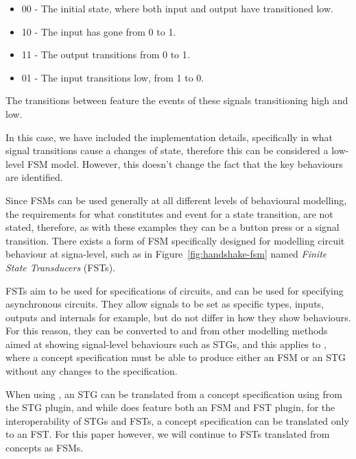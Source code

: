 \begin{itemize}

\item 00 - The initial state, where both input and output have transitioned low.

\item 10 - The input has gone from 0 to 1.

\item 11 - The output transitions from 0 to 1.

\item 01 - The input transitions low, from 1 to 0.

\end{itemize}

\noindent The transitions between feature the events of these signals transitioning high and low. 

In this case, we have included the implementation details, specifically in what signal transitions cause a changes of state, 
therefore this can be considered a low-level FSM model. However, this doesn't change the fact that the key behaviours are identified. 

Since FSMs can be used generally at all different levels of behavioural modelling, the requirements for what constitutes and event for
a state transition, are not stated, therefore, as with these examples they can be a button press or a signal transition. There exists 
a form of FSM specifically designed for modelling circuit behaviour at signa-level, such as in Figure~\ref{fig:handshake-fsm} named 
\emph{Finite State Transducers} (FSTs). 

FSTs aim to be used for specifications of circuits, and can be used for specifying asynchronous circuits. They allow signals
to be set as specific types, inputs, outputs and internals for example, but do not differ in how they show behaviours. For this reason, 
they can be converted to and from other modelling methods aimed at showing signal-level behaviours such as STGs, and this applies
to , where a concept specification must be able to produce either an FSM or an STG without any changes to the specification. 

When using , an STG can be translated from a concept specification using  from the STG plugin, and while  does
feature both an FSM and FST plugin, for the interoperability of STGs and FSTs, a concept specification can be translated only to an FST. For this paper however, 
we will continue to FSTs translated from concepts as FSMs. 

